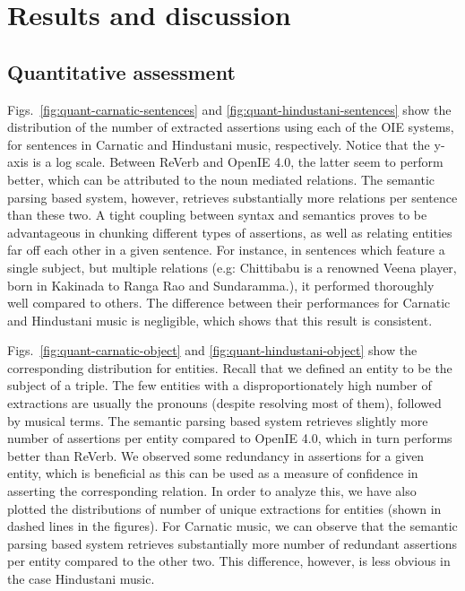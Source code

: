 \documentclass{llncs}
\begin{document}
\section{Results and discussion}
\label{sec:results}
\subsection{Quantitative assessment}
Figs.~\ref{fig:quant-carnatic-sentences} and \ref{fig:quant-hindustani-sentences} show the distribution of the number of extracted assertions using each of the OIE systems, for sentences in Carnatic and Hindustani music, respectively. Notice that the y-axis is a log scale. Between ReVerb and OpenIE 4.0, the latter seem to perform better, which can be attributed to the noun mediated relations. The semantic parsing based system, however, retrieves substantially more relations per sentence than these two. A tight coupling between syntax and semantics proves to be advantageous in chunking different types of assertions, as well as relating entities far off each other in a given sentence. For instance, in sentences which feature a single subject, but multiple relations (e.g: Chittibabu is a renowned Veena player, born in Kakinada to Ranga Rao and Sundaramma.), it performed thoroughly well compared to others. The difference between their performances for Carnatic and Hindustani music is negligible, which shows that this result is consistent.


Figs.~\ref{fig:quant-carnatic-object} and \ref{fig:quant-hindustani-object} show the corresponding distribution for entities. Recall that we defined an entity to be the subject of a triple. The few entities with a disproportionately high number of extractions are usually the pronouns (despite resolving most of them), followed by musical terms. The semantic parsing based system retrieves slightly more number of assertions per entity compared to OpenIE 4.0, which in turn performs better than ReVerb. We observed some redundancy in assertions for a given entity, which is beneficial as this can be used as a measure of confidence in asserting the corresponding relation. In order to analyze this, we have also plotted the distributions of number of unique extractions for entities (shown in dashed lines in the figures). For Carnatic music, we can observe that the semantic parsing based system retrieves substantially more number of redundant assertions per entity compared to the other two. This difference, however, is less obvious in the case Hindustani music.
\end{document}

